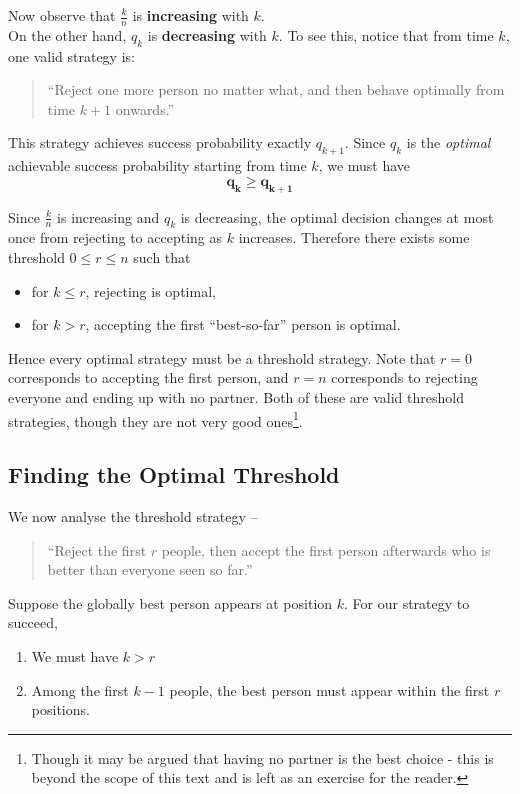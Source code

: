 \noindent Now observe that \(\frac{k}{n}\) is \textbf{increasing} with \(k\). \\

\noindent On the other hand, \(q_k\) is \textbf{decreasing} with \(k\). To see this, notice that from time \(k\), one valid strategy is:
\begin{quote}
``Reject one more person no matter what, and then behave optimally from time \(k+1\) onwards.''
\end{quote}

This strategy achieves success probability exactly \(q_{k+1}\). Since \(q_k\) is the \emph{optimal} achievable success probability starting 
from time \(k\), we must have
\[
\mathbf{q_k \ge q_{k+1}}
\]

Since \(\frac{k}{n}\) is increasing and \(q_k\) is decreasing, the optimal decision changes at most once from rejecting to accepting as \(k\) increases.
Therefore there exists some threshold \(0 \le r \le n\) such that
\begin{itemize}
    \item for \(k \le r\), rejecting is optimal,
    \item for \(k > r\), accepting the first ``best-so-far'' person is optimal.
\end{itemize}

\noindent Hence every optimal strategy must be a threshold strategy.
Note that $r=0$ corresponds to accepting the first person, and $r=n$ corresponds to rejecting everyone and ending up with no partner. 
Both of these are valid threshold strategies, though they are not very good ones\footnote{Though it may be argued that having no partner is the best choice - 
this is beyond the scope of this text and is left as an exercise for the reader.}.

\subsection*{Finding the Optimal Threshold}

We now analyse the threshold strategy --
\begin{quote}
``Reject the first \(r\) people, then accept the first person afterwards who is better than everyone seen so far.''
\end{quote}

\noindent Suppose the globally best person appears at position \(k\). For our strategy to succeed,
\begin{enumerate}
    \item We must have \(k > r\)
    \item Among the first \(k-1\) people, the best person must appear within the first \(r\) positions.
\end{enumerate}

